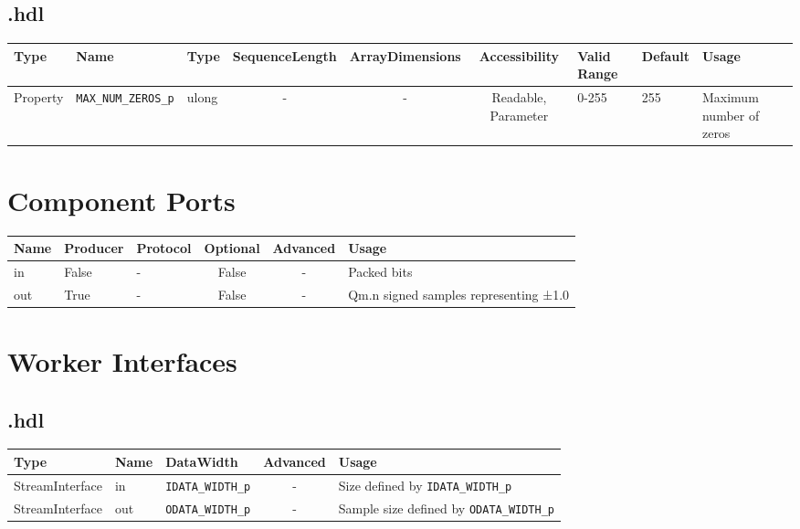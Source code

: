 \begin{landscape}
	\subsection*{\comp.hdl}
	\begin{scriptsize}
		\begin{tabular}{|p{2cm}|p{2cm}|p{1cm}|c|c|c|p{2cm}|p{1cm}|p{4cm}|}
			\hline
			\rowcolor{blue}
			Type     & Name                   & Type  & SequenceLength & ArrayDimensions & Accessibility       & Valid Range & Default & Usage                   \\
			\hline
			Property & \verb+MAX_NUM_ZEROS_p+ & ulong & -              & -               & Readable, Parameter & 0-255       & 255     & Maximum number of zeros \\
			\hline
		\end{tabular}
	\end{scriptsize}

	\section*{Component Ports}
	\begin{scriptsize}
		\begin{tabular}{|M{2cm}|M{1.5cm}|M{4cm}|c|c|M{9cm}|}
			\hline
			\rowcolor{blue}
			Name & Producer & Protocol & Optional & Advanced & Usage                                  \\
			\hline
			in   & False    & -        & False    & -        & Packed bits                            \\
			\hline
			out  & True     & -        & False    & -        & Qm.n signed samples representing ±1.0 \\
			\hline
		\end{tabular}
	\end{scriptsize}

	\section*{Worker Interfaces}
	\subsection*{\comp.hdl}
	\begin{scriptsize}
		\begin{tabular}{|M{2cm}|M{1.5cm}|M{4cm}|c|M{12cm}|}
			\hline
			Type            & Name & DataWidth            & Advanced & Usage                                       \\
			\hline
			StreamInterface & in   & \verb+IDATA_WIDTH_p+ & -        & Size defined by \verb+IDATA_WIDTH_p+        \\
			\hline
			StreamInterface & out  & \verb+ODATA_WIDTH_p+ & -        & Sample size defined by \verb+ODATA_WIDTH_p+ \\
			\hline
		\end{tabular}
	\end{scriptsize}
\end{landscape}

